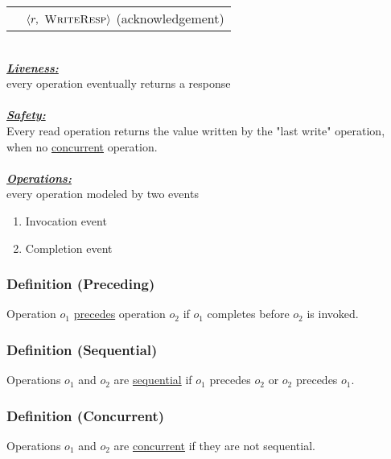 \documentclass{article}
\begin{document}
\begin{adjustwidth}{2em}{2em}
\begin{adjustwidth}{2em}{2em}
\begin{adjustwidth}{2em}{}
\begin{tabular}{l}
					\ \ $\langle r, \textsc{ WriteResp} \rangle$ (acknowledgement) \\
				\end{tabular}
				\hfill \\
				\underline{\textbf{\textit{Liveness:}}} \\
				every operation eventually returns a response \\
				\hfill \\
				\underline{\textbf{\textit{Safety:}}} \\
				Every read operation returns the value written by the "last write" operation, when no \underline{concurrent} operation. \\
				\hfill \\
				\underline{\textbf{\textit{Operations:}}} \\
				every operation modeled by two events
				\begin{enumerate}[-]
					\item Invocation event
					\item Completion event
				\end{enumerate}
			\end{adjustwidth}
			\subsubsection{Definition (Preceding)}
			\begin{adjustwidth}{2em}{}
				Operation $o_1$ \underline{precedes} operation $o_2$ if $o_1$ completes before $o_2$ is invoked.
			\end{adjustwidth}
			\subsubsection{Definition (Sequential)}
			\begin{adjustwidth}{2em}{}
				Operations $o_1$ and $o_2$ are \underline{sequential} if $o_1$ precedes $o_2$ or $o_2$ precedes $o_1$.
			\end{adjustwidth}
			\subsubsection{Definition (Concurrent)}
			\begin{adjustwidth}{2em}{}
				Operations $o_1$ and $o_2$ are \underline{concurrent} if they are not sequential.
			\end{adjustwidth}

\end{adjustwidth}
\end{adjustwidth}
\end{document}
